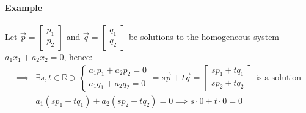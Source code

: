 \paragraph*{Example} Let $\vec{p} = \begin{bmatrix} p_1 \\ p_2 \end{bmatrix}$ and $\vec{q} = \begin{bmatrix} q_1 \\ q_2 \end{bmatrix}$ be solutions to the homogeneous system $a_1x_1 + a_2x_2 = 0$, hence:
\begin{align*}
    \implies &\exists s, t \in \mathbb{R} \ni \begin{cases}
        a_1p_1 + a_2p_2 = 0 \\
        a_1q_1 + a_2q_2 = 0
    \end{cases} = s\vec{p} + t\vec{q} = \begin{bmatrix}
        sp_1 + tq_1 \\
        sp_2 + tq_2
    \end{bmatrix} \text{ is a solution} \\
    &a_1(sp_1 + tq_1) + a_2(sp_2 + tq_2) = 0 \implies s \cdot 0 + t \cdot 0 = 0
\end{align*}

\pagebreak

